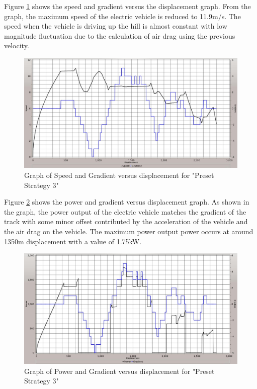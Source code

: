 Figure \ref{im:3_1} shows the speed and gradient versus the displacement graph. From the graph, the maximum speed of the electric vehicle is reduced to 11.9m/s. The speed when the vehicle is driving up the hill is almost constant with low magnitude fluctuation due to the calculation of air drag using the previous velocity. 

\begin{figure}[htb]
	\centering
	\includegraphics[width=6in]{images/3_1.jpg}
	\caption{Graph of Speed and Gradient versus displacement for "Preset Strategy 3"}
	\label{im:3_1}
\end{figure}

Figure \ref{im:3_2} shows the power and gradient versus displacement graph. As shown in the graph, the power output of the electric vehicle matches the gradient of the track with some minor offset contributed by the acceleration of the vehicle and the air drag on the vehicle. The maximum power output power occurs at around 1350m displacement with a value of 1.75kW. 

\begin{figure}[htb]
	\centering
	\includegraphics[width=6in]{images/3_2.jpg}
	\caption{Graph of Power and Gradient versus displacement for "Preset Strategy 3"}
	\label{im:3_2}
\end{figure}

